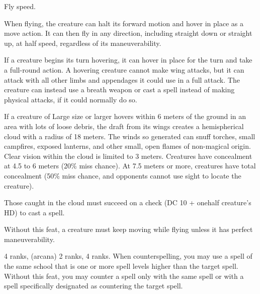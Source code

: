 {}
{Fly speed.}
{When flying, the creature can halt its forward motion and hover in place as a move action. It can then fly in any direction, including straight down or straight up, at half speed, regardless of its maneuverability.

If a creature begins its turn hovering, it can hover in place for the turn and take a full-round action. A hovering creature cannot make wing attacks, but it can attack with all other limbs and appendages it could use in a full attack. The creature can instead use a breath weapon or cast a spell instead of making physical attacks, if it could normally do so.

If a creature of Large size or larger hovers within 6 meters of the ground in an area with lots of loose debris, the draft from its wings creates a hemispherical cloud with a radius of 18 meters. The winds so generated can snuff torches, small campfires, exposed lanterns, and other small, open flames of non-magical origin. Clear vision within the cloud is limited to 3 meters. Creatures have concealment at 4.5 to 6 meters (20\% miss chance). At 7.5 meters or more, creatures have total concealment (50\% miss chance, and opponents cannot use sight to locate the creature).

Those caught in the cloud must succeed on a  check (DC 10 + onehalf creature's HD) to cast a spell.}
{Without this feat, a creature must keep moving while flying unless it has perfect maneuverability.}
{}

{}
{ 4 ranks,  (arcana) 2 ranks,  4 ranks.}
{When counterspelling, you may use a spell of the same school that is one or more spell levels higher than the target spell.}
{Without this feat, you may counter a spell only with the same spell or with a spell specifically designated as countering the target spell.}{}

